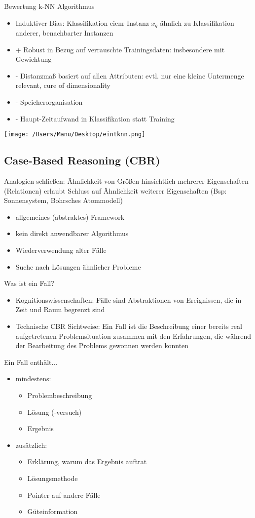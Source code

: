 \documentclass[paper=a4, fontsize=11pt]{scrartcl} %
\numberwithin{equation}{section} %
\numberwithin{figure}{section} %
\numberwithin{table}{section} %
\begin{document}
Bewertung k-NN Algorithmus
\begin{itemize}
\item Induktiver Bias: Klassifikation eienr Instanz $x_q$ ähnlich zu Klassifikation anderer, benachbarter Instanzen
\item + Robust in Bezug auf verrauschte Trainingsdaten: insbesondere mit Gewichtung
\item - Distanzmaß basiert auf allen Attributen: evtl. nur eine kleine Untermenge relevant, cure of dimensionality
\item - Speicherorganisation
\item - Haupt-Zeitaufwand in Klassifikation statt Training
\end{itemize}

\texttt{[image: /Users/Manu/Desktop/eintknn.png]}

\subsection{Case-Based Reasoning (CBR)}

Analogien schließen: Ähnlichkeit von Größen hinsichtlich mehrerer Eigenschaften (Relationen) erlaubt Schluss auf Ähnlichkeit weiterer Eigenschaften (Bsp: Sonnensystem, Bohrsches Atommodell)

\begin{itemize}
\item allgemeines (abstraktes) Framework
\item kein direkt anwendbarer Algorithmus
\item Wiederverwendung alter Fälle
\item Suche nach Lösungen ähnlicher Probleme
\end{itemize}

Was ist ein Fall?
\begin{itemize}
\item Kognitionswissenschaften: Fälle sind Abstraktionen von Ereignissen, die in Zeit und Raum begrenzt sind
\item Technische CBR Sichtweise: Ein Fall ist die Beschreibung einer bereits real aufgetretenen Problemsituation zusammen mit den Erfahrungen, die während der Bearbeitung des Problems gewonnen werden konnten
\end{itemize}

Ein Fall enthält...
\begin{itemize}
\item mindestens:
\begin{itemize}
\item Problembeschreibung
\item Lösung (-versuch)
\item Ergebnis
\end{itemize}
\item zusätzlich:
\begin{itemize}
\item Erklärung, warum das Ergebnis auftrat
\item Lösungsmethode
\item Pointer auf andere Fälle
\item Güteinformation
\end{itemize}
\end{itemize}
\end{document}
